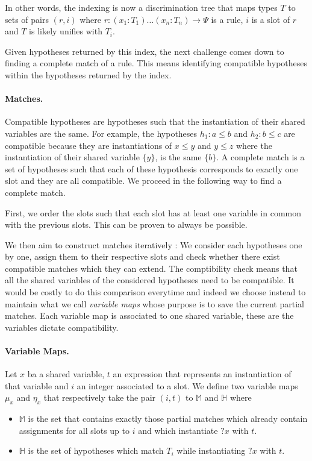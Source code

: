 \documentclass[runningheads]{llncs}
\newcommand{\xcom}[1]{{\color{cyan}{Xavier: #1}} }
\begin{document}
In other words, the indexing is now a discrimination tree that maps 
types $T$ to sets of pairs $(r,i)$ where $r : (x_1 : T_1) \dots (x_n : T_n) \to \Psi$
is a rule, $i$ is a slot of $r$ and $T$ is likely unifies with $T_i$.

Given hypotheses returned by this index, the next challenge comes
down to finding a complete match of a rule.
This means identifying compatible hypotheses within the hypotheses returned by the index.

\paragraph{Matches.}
Compatible hypotheses are hypotheses such that the instantiation of their
shared variables are the same.
For example, the hypotheses $h_1 : a \leq b$ and $h_2 : b \leq c$ are compatible
because they are instantiations of $x \leq y$ and $y \leq z$ where the
instantiation of their shared variable $\{y\}$, is the same $\{b\}$.
A complete match is a set of hypotheses such that each of these hypothesis corresponds
to exactly one slot and they are all compatible.
We proceed in the following way to find a complete match.

First, we order the slots such that each slot has at least one variable in common
with the previous slots. This can be proven to always be possible. 
\xcom{We can add the proof if we want to / have space.}

We then aim to construct matches iteratively : 
We consider each hypotheses one by one, assign them to their
respective slots and check whether there exist compatible matches
which they can extend.
The comptibility check means that all the shared variables of the considered 
hypotheses need to be compatible.
It would be costly to do this comparison everytime and indeed
we choose instead to maintain what we call \textit{variable maps} whose purpose
is to save the current partial matches.
Each variable map is associated to one shared variable, these are the
variables dictate compatibility.

\paragraph{Variable Maps.}
Let $x$ ba a shared variable, $t$ an expression that represents an
instantiation of that variable and $i$ an integer associated to a slot.
We define two variable maps $\mu_x$ and $\eta_x$ that respectively take the 
pair $(i,t)$ to $\mathbb{M}$ and $\mathbb{H}$ where 
\begin{itemize}
    \item $\mathbb{M}$ is the set that contains exactly those
    partial matches which already contain assignments for all
    slots up to $i$ and which instantiate $?x$ with $t$.
    \item $\mathbb{H}$ is the set of hypotheses which match $T_i$ while
    instantiating $?x$ with $t$.
\end{itemize}
\end{document}
